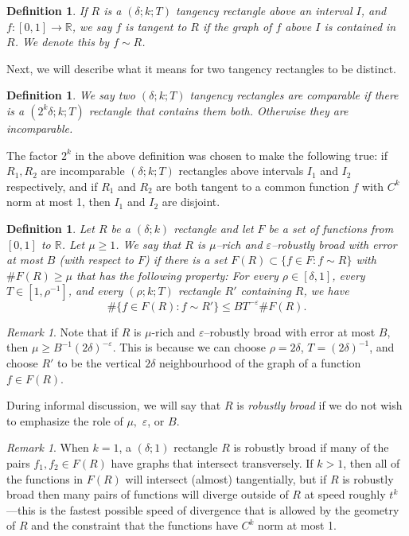 \documentclass[letterpaper, reqno,11pt]{article}
\numberwithin{equation}{section}
\newcommand{\RR}{\mathbb{R}}
\newcommand{\eps}{\varepsilon}
\numberwithin{thm}{section}
\newtheorem{defn}[thm]{Definition}
\theoremstyle{remark}
\newtheorem{rem}[thm]{Remark}
\begin{document}
\begin{defn}
If $R$ is a $(\delta;k;T)$ tangency rectangle above an interval $I$, and $f\colon [0,1]\to\RR$, we say $f$ is \emph{tangent} to $R$ if the graph of $f$ above $I$ is contained in $R$. We denote this by $f\sim R$.
\end{defn}


Next, we will describe what it means for two tangency rectangles to be distinct.

\begin{defn}\label{comparableDefn}
We say two $(\delta;k;T)$ tangency rectangles are \emph{comparable} if there is a $(2^k\delta;k;T)$ rectangle that contains them both. Otherwise they are \emph{incomparable}.
\end{defn}
The factor $2^k$ in the above definition was chosen to make the following true: if $R_1,R_2$ are incomparable $(\delta; k; T)$ rectangles above intervals $I_1$ and $I_2$ respectively, and if $R_1$ and $R_2$ are both tangent to a common function $f$ with $C^k$ norm at most 1, then $I_1$ and $I_2$ are disjoint.


\begin{defn}\label{robustlyBroadDefn}
Let $R$ be a $(\delta;k)$ rectangle and let $F$ be a set of functions from $[0,1]$ to $\RR$. Let $\mu\geq 1$. We say that $R$ is $\mu$--\emph{rich} and $\eps$--\emph{robustly broad with error at most} $B$ (with respect to $F$) if there is a set $F(R)\subset \{f\in F\colon f\sim R\}$ with $\#F(R)\geq\mu$ that has the following property: For every $\rho\in [\delta,1]$, every $T\in [1, \rho^{-1}]$, and every $(\rho; k; T)$ rectangle $R'$ containing $R$, we have
\begin{equation}\label{fExtendedRectangleBound}
\#\{f\in F(R)\colon f \sim R'\} \leq B T^{-\eps}\#F(R).
\end{equation}
\end{defn}
\begin{rem}\label{caveatRemarkMu}
Note that if $R$ is $\mu$-rich and $\eps$--robustly broad with error at most $B$, then $\mu\geq B^{-1}(2\delta)^{-\eps}$. This is because we can choose $\rho=2\delta$, $T = (2\delta)^{-1}$, and choose $R'$ to be the vertical $2\delta$ neighbourhood of the graph of a function $f\in F(R)$. 
\end{rem}

During informal discussion, we will say that $R$ is \emph{robustly broad} if we do not wish to emphasize the role of $\mu,$ $\eps$, or $B$. 


\begin{rem}
When $k=1$, a $(\delta;1)$ rectangle $R$ is robustly broad if many of the pairs $f_1,f_2\in F(R)$ have graphs that intersect transversely. If $k>1$, then all of the functions in $F(R)$ will intersect (almost) tangentially, but if $R$ is robustly broad then many pairs of functions will diverge outside of $R$ at speed roughly $t^k$---this is the fastest possible speed of divergence that is allowed by the geometry of $R$ and the constraint that the functions have $C^k$ norm at most 1. 
\end{rem}
\end{document}
